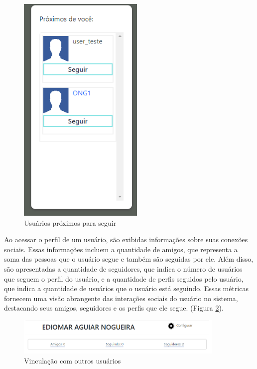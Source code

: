 \begin{figure}[htb]
     \centering
     \includegraphics[width=6cm]{arquivos/Figuras/usuarioproximo.png}
     \caption{Usuários próximos para seguir}
     \label{fig:UsuariosProximos}
\end{figure}

Ao acessar o perfil de um usuário, são exibidas informações sobre suas conexões sociais. Essas informações incluem a quantidade de amigos, que representa a soma das pessoas que o usuário segue e também são seguidas por ele. Além disso, são apresentadas a quantidade de seguidores, que indica o número de usuários que seguem o perfil do usuário, e a quantidade de perfis seguidos pelo usuário, que indica a quantidade de usuários que o usuário está seguindo. Essas métricas fornecem uma visão abrangente das interações sociais do usuário no sistema, destacando seus amigos, seguidores e os perfis que ele segue. (Figura \ref{fig:vinculacaoComUsuarios}).

\begin{figure}[htb]
     \centering
     \includegraphics[width=10cm]{arquivos/Figuras/vinculados.png}
     \caption{Vinculação com outros usuários}
     \label{fig:vinculacaoComUsuarios}
\end{figure}

